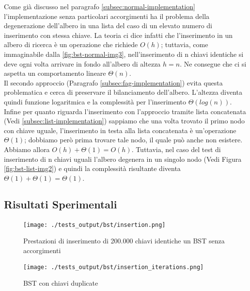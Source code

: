 \documentclass{article}
\begin{document}
Come già discusso nel paragrafo \ref{subsec:normal-implementation} l'implementazione senza particolari accorgimenti ha il problema della degenerazione dell'albero in una lista del caso di un elevato numero di inserimento con stessa chiave.
La teoria ci dice infatti che l'inserimento in un albero di ricerca è un operazione che richiede $O(h)$; tuttavia, come immaginabile dalla \cref{fig:bst-normal-img3}, nell'inserimento di n chiavi identiche si deve ogni volta arrivare in fondo all'albero di altezza $h=n$. Ne consegue che ci si aspetta un comportamento lineare $\Theta(n)$.
\\
Il secondo approccio (Paragrafo \ref{subsec:fag-implementation}) evita questa problematica e cerca di preservare il bilanciamento dell'albero. L'altezza diventa quindi funzione logaritmica e la complessità  per l'inserimento $\Theta(log(n))$.
\\
Infine per quanto riguarda l'inserimento con l'approccio tramite lista concatenata (Vedi \ref{subsec:list-implementation}) sappiamo che una volta trovato il primo nodo con chiave uguale, l'inserimento in testa alla lista concatenata è un'operazione $\Theta(1)$; dobbiamo però prima trovare tale nodo, il quale può anche non esistere. Abbiamo allora $O(h) + \Theta(1) = O(h)$. 
Tuttavia, nel caso del test di inserimento di n chiavi uguali l'albero degenera in un singolo nodo (Vedi Figura \ref{fig:bst-list-img2}) e quindi la complessità risultante diventa $\Theta(1) + \Theta(1) = \Theta(1)$.


\subsection{Risultati Sperimentali}




\begin{figure}[htbp]
 \begin{minipage}{0.5\textwidth}
    \centering
    \texttt{[image: ./tests\_output/bst/insertion.png]}
    \caption{Prestazioni di inserimento di 200.000 chiavi identiche un BST senza accorgimenti}
    \label{fig:bst-normal-insetion}
  \end{minipage}
  \begin{minipage}{0.5\textwidth}
    \centering
    \texttt{[image: ./tests\_output/bst/insertion\_iterations.png]}
    \caption{BST con chiavi duplicate}
    \label{fig:bst-normal-insetion-iterations}
  \end{minipage}%
\end{figure}
\end{document}

